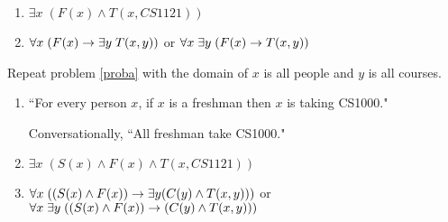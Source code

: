\begin{questions}
\begin{solution}
\begin{enumerate}[label=(\alph*),itemsep=0pt,parsep=0pt,
      topsep=0pt,partopsep=0pt]
            Conversationally, ``All freshman at MTU take CS1000."
        \item $\exists x\; (F(x) \wedge T(x,CS 1121))$
        \item $\forall x\; (F(x) \rightarrow \exists y\; T(x,y))$ or $\forall x\; \exists y\; (F(x) \rightarrow T(x,y))$
    \end{enumerate}
\end{solution}


 Repeat problem \ref{proba} with the domain of $x$ is all people and $y$ is all courses.
    \ifprintanswers
        \vspace{-12pt}
    \fi
\begin{solution}
    \begin{enumerate}[label=(\alph*),itemsep=0pt,parsep=0pt,
      topsep=0pt,partopsep=0pt]
        \item  ``For every person $x$, if $x$ is a freshman then $x$ is taking CS1000."

            Conversationally, ``All freshman take CS1000."
        \item $\exists x\; (S(x) \wedge F(x) \wedge T(x,CS 1121))$
        \item $\forall x\; ((S(x) \wedge F(x)) \rightarrow \exists y (C(y) \wedge T(x,y)))$ or \\
        $\forall x\; \exists y\; ((S(x) \wedge F(x)) \rightarrow (C(y) \wedge T(x,y)))$
    \end{enumerate}
\end{solution}




\end{questions}
